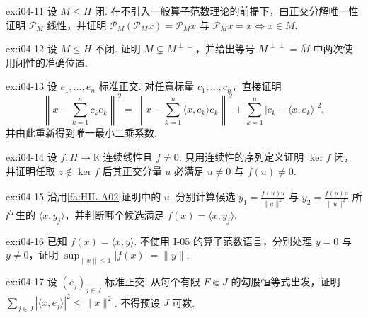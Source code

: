\begin{FAExercise}[投影的线性与幂等性]{ex:i04-11}
设 \(\displaystyle M\leqslant H\) 闭. 在不引入一般算子范数理论的前提下，由正交分解唯一性证明 \(\displaystyle \mathcal P_M\) 线性，并证明 \(\displaystyle \mathcal P_M(\mathcal P_Mx)=\mathcal P_Mx\) 与 \(\displaystyle \mathcal P_Mx=x\iff x\in M\).
\end{FAExercise}

\begin{FAExercise}[双正交补的非闭情形]{ex:i04-12}
设 \(\displaystyle M\leqslant H\) 不闭. 证明 \(\displaystyle M\subsetneq M^{\perp\perp}\)，并给出等号 \(\displaystyle M^{\perp\perp}=\overline M\) 中两次使用闭性的准确位置.
\end{FAExercise}

\begin{FAExercise}[有限正交最小二乘]{ex:i04-13}
设 \(\displaystyle e_1,\dots,e_n\) 标准正交. 对任意标量 \(\displaystyle c_1,\dots,c_n\)，直接证明
\[
\left\|x-\sum_{k=1}^{n}c_ke_k\right\|^2
=\left\|x-\sum_{k=1}^{n}\langle x,e_k\rangle e_k\right\|^2
+\sum_{k=1}^{n}|c_k-\langle x,e_k\rangle|^2,
\]
并由此重新得到唯一最小二乘系数.
\end{FAExercise}

\begin{FAExercise}[Riesz证明中的核闭性]{ex:i04-14}
设 \(\displaystyle f:H\to\mathbb K\) 连续线性且 \(\displaystyle f\neq0\). 只用连续性的序列定义证明 \(\displaystyle \ker f\) 闭，并证明任取 \(\displaystyle z\notin\ker f\) 后其正交分量 \(\displaystyle u\) 必满足 \(\displaystyle u\neq0\) 与 \(\displaystyle f(u)\neq0\).
\end{FAExercise}

\begin{FAExercise}[Riesz复系数专项]{ex:i04-15}
沿用\autoref{fa:HIL-A02}证明中的 \(\displaystyle u\). 分别计算候选 \(\displaystyle y_1=\frac{f(u)u}{\|u\|^2}\) 与 \(\displaystyle y_2=\frac{\overline{f(u)}u}{\|u\|^2}\) 所产生的 \(\displaystyle \langle x,y_j\rangle\)，并判断哪个候选满足 \(\displaystyle f(x)=\langle x,y_j\rangle\).
\end{FAExercise}

\begin{FAExercise}[Riesz的上确界恒等式]{ex:i04-16}
已知 \(\displaystyle f(x)=\langle x,y\rangle\). 不使用 I-05 的算子范数语言，分别处理 \(\displaystyle y=0\) 与 \(\displaystyle y\neq0\)，证明 \(\displaystyle \sup_{\|x\|\leqslant1}|f(x)|=\|y\|\).
\end{FAExercise}

\begin{FAExercise}[任意指标Bessel求和]{ex:i04-17}
设 \(\displaystyle (e_j)_{j\in J}\) 标准正交. 从每个有限 \(\displaystyle F\Subset J\) 的勾股恒等式出发，证明 \(\displaystyle \sum_{j\in J}|\langle x,e_j\rangle|^2\leqslant\|x\|^2\). 不得预设 \(\displaystyle J\) 可数.
\end{FAExercise}

